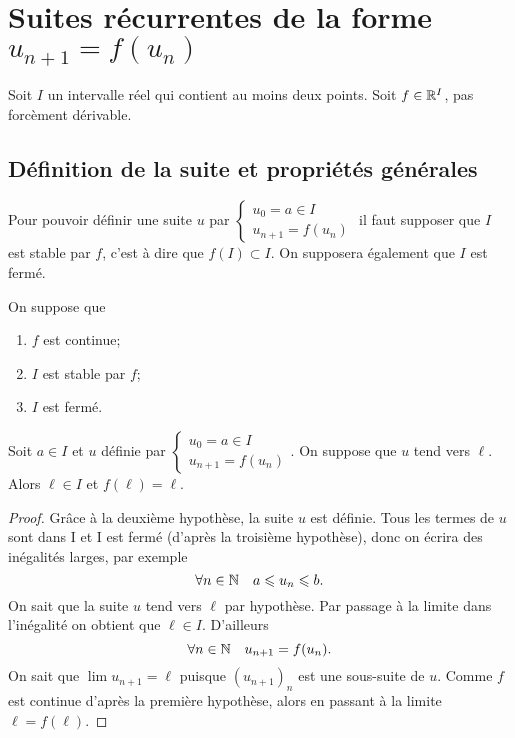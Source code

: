 \section{Suites récurrentes de la forme \(u_{n+1}=f(u_n)\)}

Soit \(I\) un intervalle réel qui contient au moins deux points. Soit \(f \in \mathbb{R}^I\), pas forcèment dérivable.

\subsection{Définition de la suite et propriétés générales}

Pour pouvoir définir une suite \(u\) par \(\begin{cases} u_0=a \in I \\ u_{n+1}=f(u_n) \end{cases}\) il faut supposer que \(I\) est stable par \(f\), c'est à dire que \(f(I) \subset I\). On supposera également que \(I\) est fermé.

\begin{prop}
  On suppose que 
  \begin{enumerate}
  \item \(f\) est continue;
  \item \(I\) est stable par \(f\);
  \item \(I\) est fermé.
  \end{enumerate}
  Soit \(a \in I\) et \(u\) définie par \(\begin{cases} u_0=a \in I \\ u_{n+1}=f(u_n) \end{cases}\). On suppose que \(u\) tend vers \(\ell\). Alors \(\ell \in I\) et \(f(\ell)=\ell\).
\end{prop}
\begin{proof}
  Grâce à la deuxième hypothèse, la suite \(u\) est définie. Tous les termes de \(u\) sont dans I et I est fermé (d'après la troisième hypothèse), donc on écrira des inégalités larges, par exemple
  \begin{equation}
    \forall n \in \mathbb{N} \quad a \leqslant u_n \leqslant b.
  \end{equation}
  On sait que la suite \(u\) tend vers \(\ell\) par hypothèse. Par passage à la limite dans l'inégalité on obtient que \(\ell \in I\). D'ailleurs
  \begin{equation}
    \forall n \in \mathbb{N} \quad u_{n+1}=f(u_n).
  \end{equation}
  On sait que \(\lim u_{n+1}=\ell\) puisque \((u_{n+1})_n\) est une sous-suite de \(u\). Comme \(f\) est continue d'après la première hypothèse, alors en passant à la limite \(\ell=f(\ell)\).
\end{proof}

